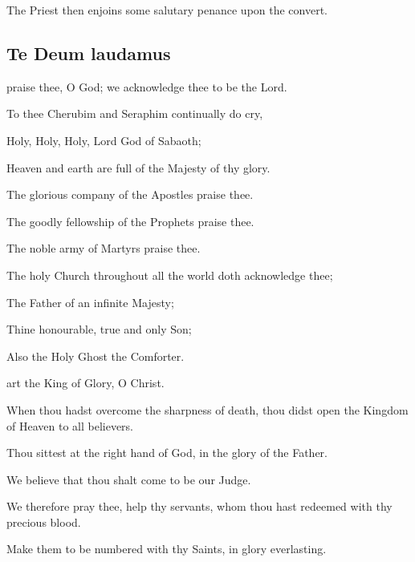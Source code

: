 \begin{rubric}
    The Priest then enjoins some salutary penance upon the convert.
\end{rubric}
\subsection{Te Deum laudamus}
 praise thee, O God; we acknowledge thee to be the Lord.\par
{}
    To thee Cherubim and Seraphim continually do cry,\par
    Holy, Holy, Holy, Lord God of Sabaoth;\par
    Heaven and earth are full of the Majesty of thy glory.\par
    The glorious company of the Apostles praise thee.\par
    The goodly fellowship of the Prophets praise thee.\par
    The noble army of Martyrs praise thee.\par
    The holy Church throughout all the world doth acknowledge thee;\par
    The Father of an infinite Majesty;\par
    Thine honourable, true and only Son;\par
    Also the Holy Ghost the Comforter.\par
    
 art the King of Glory, O Christ.\par
{}
    When thou hadst overcome the sharpness of death, thou didst open the Kingdom of Heaven to all believers.\par
    Thou sittest at the right hand of God, in the glory of the Father.\par
    We believe that thou shalt come to be our Judge. 
    \par
    We therefore pray thee, help thy servants, whom thou hast redeemed with thy precious blood.\par
    Make them to be numbered with thy Saints, in glory everlasting.\par
    
